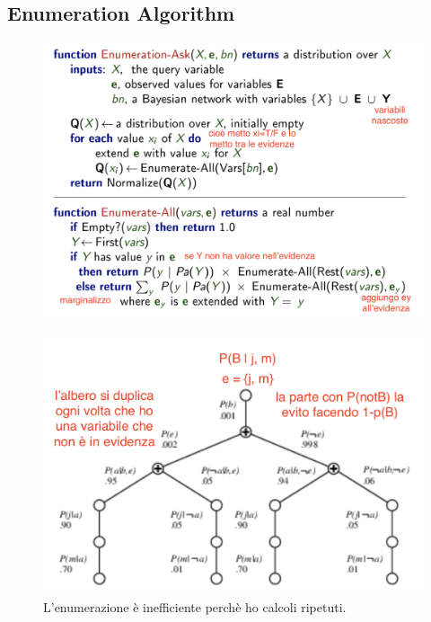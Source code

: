 \documentclass[a4paper, notitlepage, 9pt]{extreport}
\begin{document}
\subsection*{Enumeration Algorithm}
\begin{multicols}{2}
\begin{figure}[H]
	\centering
	\includegraphics[scale=0.25]{Alg}
\end{figure}
	\columnbreak
	\begin{figure}[H]
		\centering
		\includegraphics[scale=0.30]{Alb}
		\caption*{L'enumerazione è inefficiente perchè ho calcoli ripetuti.}
	\end{figure}
\end{multicols}
\end{document}
